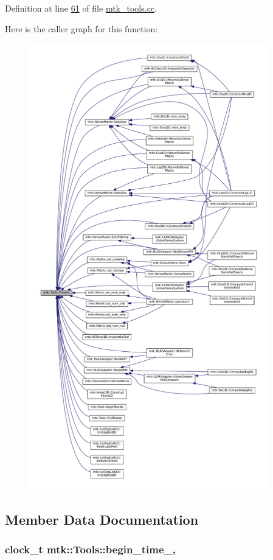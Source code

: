 Definition at line \hyperlink{mtk__tools_8cc_source_l00061}{61} of file \hyperlink{mtk__tools_8cc_source}{mtk\-\_\-tools.\-cc}.



Here is the caller graph for this function\-:
\nopagebreak
\begin{figure}[H]
\begin{center}
\leavevmode
\includegraphics[height=550pt]{classmtk_1_1Tools_acbcff02946d3db565d53ecbcc459f0b5_icgraph}
\end{center}
\end{figure}




\subsection{Member Data Documentation}
\hypertarget{classmtk_1_1Tools_a4bd58d08397db42271ed9e2d3ecc9963}{
\subsubsection[{begin\-\_\-time\-\_\-}]{\setlength{\rightskip}{0pt plus 5cm}clock\-\_\-t mtk\-::\-Tools\-::begin\-\_\-time\-\_\-\hspace{0.3cm}{\ttfamily [static]}, {\ttfamily [private]}}}\label{classmtk_1_1Tools_a4bd58d08397db42271ed9e2d3ecc9963}


